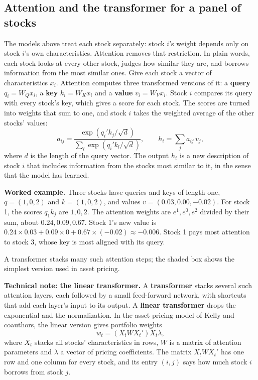 \subsection{Attention and the transformer for a panel of stocks}

The models above treat each stock separately: stock $i$'s weight depends only on stock $i$'s own characteristics. Attention removes that restriction. In plain words, each stock looks at every other stock, judges how similar they are, and borrows information from the most similar ones. Give each stock a vector of characteristics $x_i$. Attention computes three transformed versions of it: a \textbf{query} $q_i = W_Q x_i$, a \textbf{key} $k_i = W_K x_i$ and a \textbf{value} $v_i = W_V x_i$. Stock $i$ compares its query with every stock's key, which gives a score for each stock. The scores are turned into weights that sum to one, and stock $i$ takes the weighted average of the other stocks' values:
\begin{equation}
  a_{ij} = \frac{\exp\left(q_i' k_j/\sqrt{d}\right)}{\sum_{l} \exp\left(q_i' k_l/\sqrt{d}\right)}, \qquad h_i = \sum_{j} a_{ij}\, v_j,
  \label{eq:22-attention}
\end{equation}
where $d$ is the length of the query vector. The output $h_i$ is a new description of stock $i$ that includes information from the stocks most similar to it, in the sense that the model has learned.

\textbf{Worked example.} Three stocks have queries and keys of length one, $q = (1, 0, 2)$ and $k = (1, 0, 2)$, and values $v = (0.03, 0.00, -0.02)$. For stock 1, the scores $q_1 k_j$ are $1, 0, 2$. The attention weights are $e^1, e^0, e^2$ divided by their sum, about $0.24, 0.09, 0.67$. Stock 1's new value is $0.24 \times 0.03 + 0.09 \times 0 + 0.67 \times (-0.02) \approx -0.006$. Stock 1 pays most attention to stock 3, whose key is most aligned with its query.

A transformer stacks many such attention steps; the shaded box shows the simplest version used in asset pricing.

\begin{technote}
\textbf{Technical note: the linear transformer.} A \textbf{transformer} stacks several such attention layers, each followed by a small feed-forward network, with shortcuts that add each layer's input to its output. A \textbf{linear transformer} drops the exponential and the normalization. In the asset-pricing model of Kelly and coauthors, the linear version gives portfolio weights
\begin{equation}
  w_t = \left(X_t W X_t'\right) X_t \lambda,
  \label{eq:22-linear}
\end{equation}
where $X_t$ stacks all stocks' characteristics in rows, $W$ is a matrix of attention parameters and $\lambda$ a vector of pricing coefficients. The matrix $X_t W X_t'$ has one row and one column for every stock, and its entry $(i,j)$ says how much stock $i$ borrows from stock $j$.
\end{technote}

